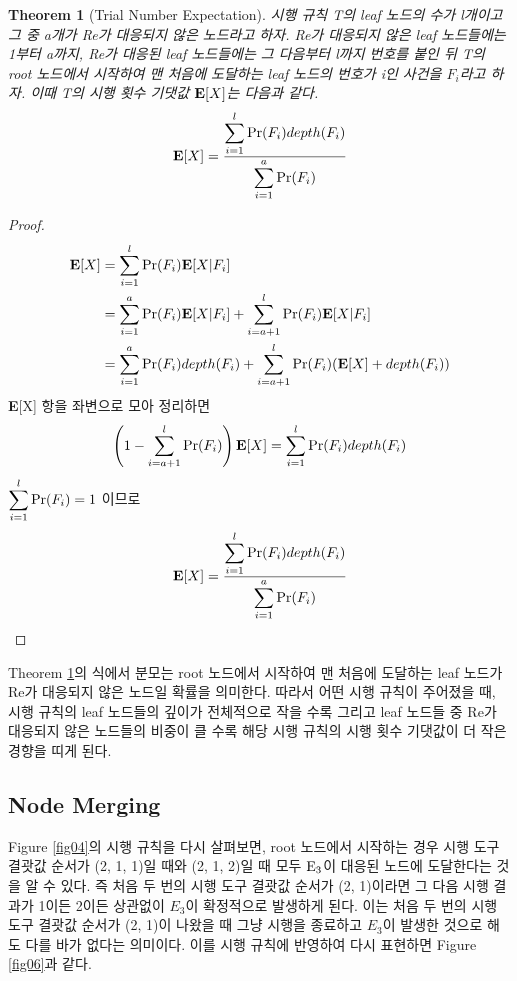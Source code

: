 \documentclass[11pt]{article}
\newtheorem{theorem}{Theorem}
\begin{document}
\singlespacing
\begin{theorem}[Trial Number Expectation]
시행 규칙 T의 leaf 노드의 수가 l개이고 그 중 a개가 Re가 대응되지 않은 노드라고 하자. Re가 대응되지 않은 leaf 노드들에는 1부터 a까지, Re가 대응된 leaf 노드들에는 그 다음부터 l까지 번호를 붙인 뒤 T의 root 노드에서 시작하여 맨 처음에 도달하는 leaf 노드의 번호가 i인 사건을 $F_{i}$라고 하자. 이때 T의 시행 횟수 기댓값 $\textnormal{\textbf{E}}[X]$는 다음과 같다.
\[\textnormal{\textbf{E}}[X] = \frac{\displaystyle \sum_{i=1}^{l} \textnormal{Pr}(F_{i})depth(F_{i})}{\displaystyle \sum_{i=1}^{a} \textnormal{Pr}(F_{i})}\]
\label{thm04}
\end{theorem}
\doublespacing

\begin{proof}
\[
\begin{split}
\textbf{E}[X] & = \sum_{i=1}^{l} \textnormal{Pr}(F_{i}) \textbf{E}[X|F_{i}]\\
& = \sum_{i=1}^{a} \textnormal{Pr}(F_{i}) \textbf{E}[X|F_{i}] + \sum_{i=a+1}^{l} \textnormal{Pr}(F_{i}) \textbf{E}[X|F_{i}]\\
& = \sum_{i=1}^{a} \textnormal{Pr}(F_{i})depth(F_{i}) + \sum_{i=a+1}^{l} \textnormal{Pr}(F_{i})(\textbf{E}[X] + depth(F_{i}))\\
\end{split}
\]
\textbf{E}[X] 항을 좌변으로 모아 정리하면
\[\left(1 - \sum_{i=a+1}^{l} \textnormal{Pr}(F_{i})\right)\textbf{E}[X] = \sum_{i=1}^{l} \textnormal{Pr}(F_{i})depth(F_{i})\]
$\displaystyle \sum_{i=1}^{l} \textnormal{Pr}(F_{i}) = 1$ 이므로
\[\textbf{E}[X] = \frac{\displaystyle \sum_{i=1}^{l} \textnormal{Pr}(F_{i})depth(F_{i})}{\displaystyle \sum_{i=1}^{a} \textnormal{Pr}(F_{i})}\]
\end{proof}

Theorem \ref{thm04}의 식에서 분모는 root 노드에서 시작하여 맨 처음에 도달하는 leaf 노드가 Re가 대응되지 않은 노드일 확률을 의미한다. 따라서 어떤 시행 규칙이 주어졌을 때, 시행 규칙의 leaf 노드들의 깊이가 전체적으로 작을 수록 그리고 leaf 노드들 중 Re가 대응되지 않은 노드들의 비중이 클 수록 해당 시행 규칙의 시행 횟수 기댓값이 더 작은 경향을 띠게 된다.

\subsection{Node Merging} \label{subsection3-4}
Figure \ref{fig04}의 시행 규칙을 다시 살펴보면, root 노드에서 시작하는 경우 시행 도구 결괏값 순서가 (2, 1, 1)일 때와 (2, 1, 2)일 때 모두 $\textnormal{E}_{3}$이 대응된 노드에 도달한다는 것을 알 수 있다. 즉 처음 두 번의 시행 도구 결괏값 순서가 (2, 1)이라면 그 다음 시행 결과가 1이든 2이든 상관없이 $E_{3}$이 확정적으로 발생하게 된다. 이는 처음 두 번의 시행 도구 결괏값 순서가 (2, 1)이 나왔을 때 그냥 시행을 종료하고 $E_{3}$이 발생한 것으로 해도 다를 바가 없다는 의미이다. 이를 시행 규칙에 반영하여 다시 표현하면 Figure \ref{fig06}과 같다.\\
\end{document}
